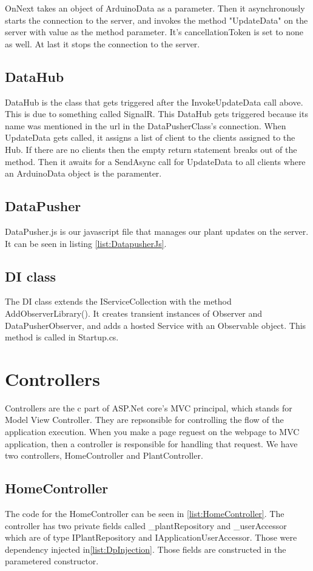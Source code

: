 \documentclass[a4paper,12pt,oneside,openright,titlepage]{book}
\begin{document}
OnNext takes an object of ArduinoData as a parameter. Then it asynchronously starts the connection to the server, and invokes the method "UpdateData" on the server with value as the method parameter. It's cancellationToken is set to none as well. At last it stops the connection to the server. 

\subsection{DataHub}
DataHub is the class that gets triggered after the InvokeUpdateData call above. This is due to something called SignalR. This DataHub gets triggered because its name was mentioned in the url in the DataPusherClass's connection. When UpdateData gets called, it assigns a list of client to the clients assigned to the Hub. If there are no clients then the empty return statement breaks out of the method. Then it awaits for a SendAsync call for UpdateData to all clients where an ArduinoData object is the paramenter.

\subsection{DataPusher}
DataPusher.js is our javascript file that manages our plant updates on the server. It can be seen in listing \ref{list:DatapusherJs}.

\subsection{DI class}
The DI class extends the IServiceCollection with the method AddObserverLibrary(). It creates transient instances of Observer and DataPusherObserver, and adds a hosted Service with an Observable object. This method is called in Startup.cs.


\section{Controllers}
Controllers are the c part of ASP.Net core's MVC principal, which stands for Model View Controller. They are repsonsible for controlling the flow of the application execution. When you make a page reguest on the webpage to MVC application, then a controller is responsible for handling that request. We have two controllers,  HomeController and PlantController.
\subsection{HomeController}
The code for the HomeController can be seen in \ref{list:HomeController}. The controller has two private fields called \_plantRepository and \_userAccessor which are of type IPlantRepository and IApplicationUserAccessor. Those were dependency injected in\ref{list:DpInjection}. Those fields are constructed in the parametered constructor. 
\end{document}
